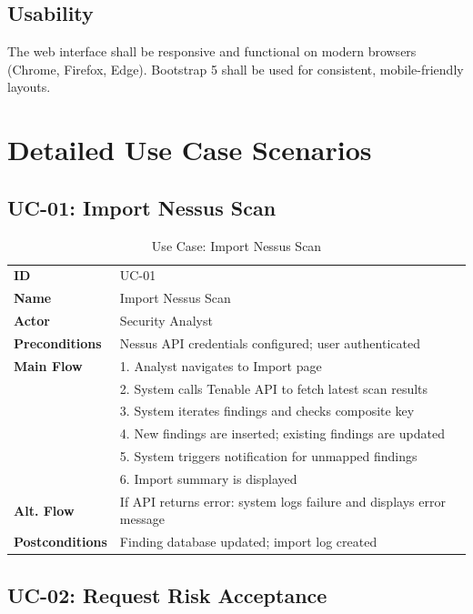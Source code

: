 \subsection{Usability}
The web interface shall be responsive and functional on modern browsers (Chrome, Firefox, Edge). Bootstrap 5 shall be used for consistent, mobile-friendly layouts.

\section{Detailed Use Case Scenarios}

\subsection{UC-01: Import Nessus Scan}

\begin{table}[H]
\centering
\caption{Use Case: Import Nessus Scan}
\begin{tabularx}{\linewidth}{lX}
\toprule
\textbf{ID} & UC-01 \\
\textbf{Name} & Import Nessus Scan \\
\textbf{Actor} & Security Analyst \\
\textbf{Preconditions} & Nessus API credentials configured; user authenticated \\
\textbf{Main Flow} &
1. Analyst navigates to Import page \\&
2. System calls Tenable API to fetch latest scan results \\&
3. System iterates findings and checks composite key \\&
4. New findings are inserted; existing findings are updated \\&
5. System triggers notification for unmapped findings \\&
6. Import summary is displayed \\
\textbf{Alt. Flow} & If API returns error: system logs failure and displays error message \\
\textbf{Postconditions} & Finding database updated; import log created \\
\bottomrule
\end{tabularx}
\end{table}

\subsection{UC-02: Request Risk Acceptance}

